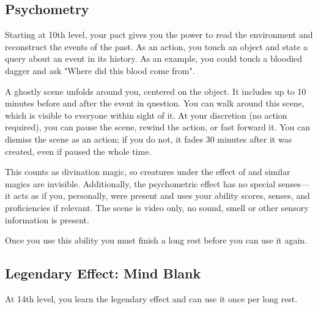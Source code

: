 \subsection{Psychometry}
Starting at 10th level, your pact gives you the power to read the environment and reconstruct the events of the past. As an action, you touch an object and state a query about an event in its history. As an example, you could touch a bloodied dagger and ask "Where did this blood come from".

A ghostly scene unfolds around you, centered on the object. It includes up to 10 minutes before and after the event in question. You can walk around this scene, which is visible to everyone within sight of it. At your discretion (no action required), you can pause the scene, rewind the action, or fast forward it. You can dismiss the scene as an action; if you do not, it fades 30 minutes after it was created, even if paused the whole time.

This counts as divination magic, so creatures under the effect of  and similar magics are invisible. Additionally, the psychometric effect has no special senses---it acts as if you, personally, were present and uses your ability scores, senses, and proficiencies if relevant. The scene is video only, no sound, smell or other sensory information is present.

Once you use this ability you must finish a long rest before you can use it again.

\subsection{Legendary Effect: Mind Blank}
At 14th level, you learn the legendary effect  and can use it once per long rest.